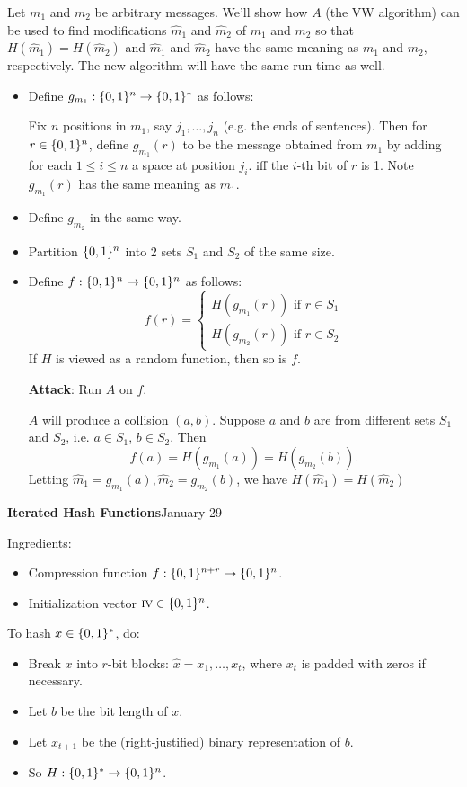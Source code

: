 \documentclass[a4paper,12pt]{article}
\begin{document}
Let $m_1$ and $m_2$ be arbitrary messages.  We'll show how $A$ (the VW algorithm)
can be used to find modifications $\hat m_1$ and $\hat m_2$ of $m_1$ and $m_2$ 
so that $H(\hat m_1) = H(\hat m_2)$ and $\hat m_1$ and $\hat m_2$ have the same
meaning as $m_1$ and $m_2$, respectively.
The new algorithm will have the same run-time as well.

\begin{itemize}
\item
Define $g_{m_1}:\{0,1\}^n \to \{0,1\}^*$ as follows:

Fix $n$ positions in $m_1$, say $j_1,\ldots, j_n$ (e.g. the ends of sentences). 
Then for $r\in \{0,1\}^n$, define $g_{m_1}(r)$ to be the message obtained from $m_1$
by adding for each $1\le i \le n$ a space at position $j_i$. iff the $i$-th bit
of $r$ is 1.  Note $g_{m_1}(r)$ has the same meaning as $m_1$.
\item
Define $g_{m_2}$ in the same way.
\item
Partition $\{0,1\}^n$ into 2 sets $S_1$ and $S_2$ of the same size.
\item
Define $f:\{0,1\}^n\to\{0,1\}^n$ as follows:
$$
f(r) =
\begin{cases}
H(g_{m_1}(r)) \text{ if } r\in S_1 \\
H(g_{m_2}(r)) \text{ if } r\in S_2
\end{cases}
$$
If $H$ is viewed as a random function, then so is $f$.

{\bf Attack}: Run $A$ on $f$.

$A$ will produce a collision $(a,b)$.  Suppose $a$ and $b$ are from different sets $S_1$ and $S_2$, i.e. $a\in S_1$, $b\in S_2$.  Then
$$
f(a)=H(g_{m_1}(a)) = H(g_{m_2}(b)).
$$
Letting $\hat m_1 = g_{m_1}(a), \hat m_2 = g_{m_2}(b)$, we have $H(\hat m_1) = H(\hat m_2)$

\end{itemize}


\clearpage
{\bf Iterated Hash Functions}\hfill January 29

Ingredients:
\begin{itemize}
\item
Compression function $f:\{0,1\}^{n+r} \to \{0,1\}^n$.
\item
Initialization vector $\text{\sc iv} \in\{0,1\}^n$.
\end{itemize}
To hash $x\in\{0,1\}^*$, do:
\begin{itemize}
\item
Break $x$ into $r$-bit blocks: $\hat x = x_1,\ldots,x_t$,
where $x_t$ is padded with zeros if necessary.
\item
Let $b$ be the bit length of $x$.
\item
Let $x_{t+1}$ be the (right-justified) binary representation of $b$.
\item
So $H:\{0,1\}^* \to \{0,1\}^n$.
\end{itemize}
\end{document}
